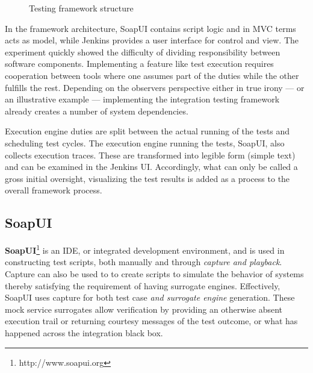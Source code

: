 \documentclass[12pt,a4paper,oneside,pdftex]{report}
\begin{document}
{{\begin{figure}[H]
\caption{Testing framework structure} \label{fig:structure}
\end{figure}

In the framework architecture, SoapUI contains script logic and in MVC terms acts as model, while Jenkins provides a user interface for control and view. The experiment quickly showed the difficulty of dividing responsibility between software components. Implementing a feature like test execution requires cooperation between tools where one assumes part of the duties while the other fulfills the rest. Depending on the observers perspective either in true irony --- or an illustrative example --- implementing the integration testing framework already creates a number of system dependencies.

Execution engine duties are split between the actual running of the tests and scheduling test cycles. The execution engine running the tests, SoapUI, also collects execution traces. These are transformed into legible form (simple text) and can be examined in the Jenkins UI. Accordingly, what can only be called a gross initial oversight, visualizing the test results is added as a process to the overall framework process.

\subsection{SoapUI}

\textbf{SoapUI}\footnote{http://www.soapui.org} is an IDE, or integrated development environment, and is used in constructing test scripts, both manually and through \emph{capture and playback}. Capture can also be used to to create scripts to simulate the behavior of systems thereby satisfying the requirement of having surrogate engines. Effectively, SoapUI uses capture for both test case \emph{and surrogate engine} generation. These mock service surrogates allow verification by providing an otherwise absent execution trail or returning courtesy messages of the test outcome, or what has happened across the integration black box.

}}
\end{document}
